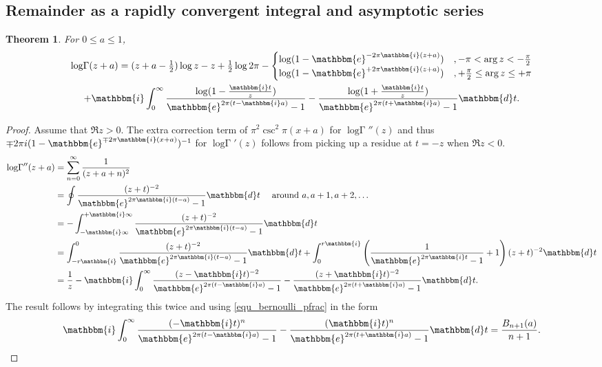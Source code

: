\documentclass[12pt]{article}
\newcommand{\op}[1]  { \operatorname{ #1 }}
\newcommand{\logG} {\operatorname {log \Gamma}}
\newcommand{\ee}[0] {\mathbbm{e}}
\newcommand{\ii}[0] {\mathbbm{i}}
\newcommand{\dd}[0] {\mathbbm{d}}
\numberwithin{equation}{section}
\newtheorem{theorem}{Theorem}[section]
\begin{document}
\subsection{Remainder as a rapidly convergent integral and asymptotic series}
\begin{theorem}
For $0 \le a \le 1$,
\begin{gather*}
\logG(z+a) = (z+a-\tfrac{1}{2}) \log z - z + \tfrac{1}{2} \log 2\pi- \begin{cases} \log(1-\ee^{-2\pi \ii (z+a)})&, - \pi < \op{arg} z < -\frac{\pi}{2}\\
 \log(1-\ee^{+2\pi \ii (z+a)})&, +\frac{\pi}{2} \le \op{arg} z \le +\pi \end{cases} \\
 + \ii \int_{0}^{\infty} \frac{\log(1-\frac{\ii t}{z})}{\ee^{2\pi (t-\ii a)}-1}-\frac{\log(1+\frac{\ii t}{z})}{\ee^{2\pi (t+\ii a)}-1} \dd t\text{.}
\end{gather*}
\end{theorem}
\begin{proof}
Assume that $\Re z > 0$. The extra correction term of $\pi^2 \csc^2 \pi (x+a)$ for $\logG''(z)$ and thus $\mp 2 \pi i (1-\ee^{\mp 2\pi \ii (x+a)})^{-1}$ for $\logG'(z)$ follows from picking up a residue at $t=-z$ when $\Re z < 0$.
\begin{align*}
\logG''(z+a) &= \sum_{n=0}^{\infty}\frac{1}{(z+a+n)^2}\\
&= \oint \frac{(z+t)^{-2}}{\ee^{2\pi \ii (t-a)} - 1} \dd t \quad \text{ around  } a,a+1,a+2, \dots\\
&= -\int_{-\ii \infty}^{+\ii \infty} \frac{(z+t)^{-2}}{\ee^{2\pi \ii (t-a)} - 1} \dd t\\
&= \int_{-r \ii}^{0} \frac{(z+t)^{-2}}{\ee^{2\pi \ii (t-a)}-1} \dd t + \int_{0}^{r \ii} \left(\frac{1}{\ee^{2\pi \ii t}-1}+1\right) (z+t)^{-2} \dd t\\
&= \frac{1}{z} - \ii \int_{0}^{\infty} \frac{(z-\ii t)^{-2}}{\ee^{2\pi (t-\ii a)}-1} - \frac{(z+\ii t)^{-2}}{\ee^{2\pi (t+\ii a)}-1} \dd t\text{.}
\end{align*}
The result follows by integrating this twice and using \eqref{equ_bernoulli_pfrac} in the form
\begin{equation*}
\ii \int_{0}^{\infty} \frac{(-\ii t)^n}{\ee^{2\pi (t-\ii a)}-1} - \frac{(\ii t)^n}{\ee^{2\pi (t+\ii a)}-1} \dd t = \frac{B_{n+1}(a)}{n+1}\text{.}
\end{equation*}
\end{proof}
\end{document}
